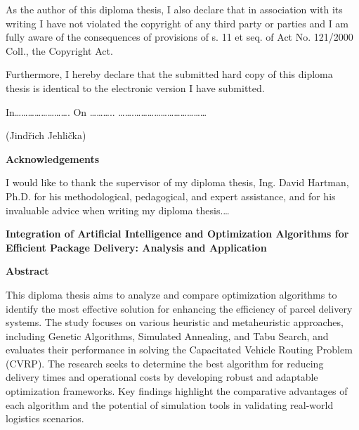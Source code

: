 \documentclass{article}
\begin{document}
    As the author of this diploma thesis, I also declare that in association with its writing I have not violated the copyright of any third party or parties and I am fully aware of the consequences of provisions of s. 11 et seq. of Act No. 121/2000 Coll., the Copyright Act.

    Furthermore, I hereby declare that the submitted hard copy of this diploma thesis is identical to the electronic version I have submitted.

    In\ldots\ldots\ldots\ldots\ldots\ldots\ldots\ldots. On
    \ldots\ldots\ldots..
    \ldots\ldots.\ldots\ldots\ldots\ldots\ldots\ldots\ldots\ldots\ldots\ldots\ldots{}

    (Jindřich Jehlička)

    \newpage
    \thispagestyle{empty}

    \vspace*{\fill}


    \textbf{Acknowledgements}

    I would like to thank the supervisor of my diploma thesis, Ing. David Hartman, Ph.D. for his methodological, pedagogical, and expert assistance, and for his invaluable advice when writing my diploma thesis.\ldots{}


    \newpage


    \begin{center}
        \textbf{\Large Integration of Artificial Intelligence and Optimization Algorithms for Efficient Package Delivery: Analysis and Application}
    \end{center}



    \vspace*{\fill}

    \textbf{Abstract}

    This diploma thesis aims to analyze and compare optimization algorithms to identify the most effective solution for enhancing the efficiency of parcel delivery systems.
    The study focuses on various heuristic and metaheuristic approaches, including Genetic Algorithms, Simulated Annealing, and Tabu Search, and evaluates their performance in solving the Capacitated Vehicle Routing Problem (CVRP). The research seeks to determine the best algorithm for reducing delivery times and operational costs by developing robust and adaptable optimization frameworks. Key findings highlight the comparative advantages of each algorithm and the potential of simulation tools in validating real-world logistics scenarios.
\end{document}
